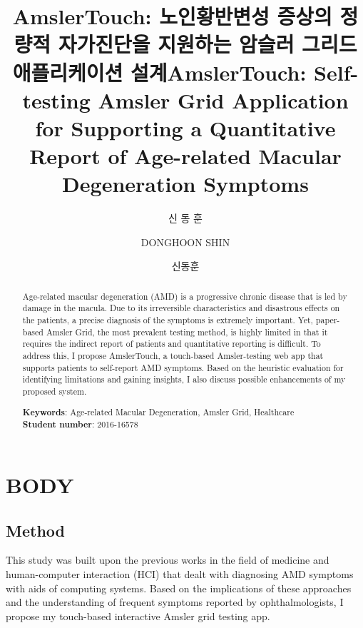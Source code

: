 \documentclass[doctor]{snuece-bs}
\title[korean]{AmslerTouch: 노인황반변성 증상의 정량적 자가진단을 지원하는 암슬러 그리드 애플리케이션 설계}
\title[english]{AmslerTouch: Self-testing Amsler Grid Application for Supporting a Quantitative Report of Age-related Macular Degeneration Symptoms}
\author[korean]{신 동 훈}
\author[english]{DONGHOON SHIN}
\author[nospace]{신동훈}
\begin{document}
\renewcommand{\baselinestretch}{1.5}

\selectfont

\begin{abstract}
	\par
	Age-related macular degeneration (AMD) is a progressive chronic disease that is led by damage in the macula. Due to its irreversible characteristics and disastrous effects on the patients, a precise diagnosis of the symptoms is extremely important. Yet, paper-based Amsler Grid, the most prevalent testing method, is highly limited in that it requires the indirect report of patients and quantitative reporting is difficult. To address this, I propose AmslerTouch, a touch-based Amsler-testing web app that supports patients to self-report AMD symptoms. Based on the heuristic evaluation for identifying limitations and gaining insights, I also discuss possible enhancements of my proposed system.
	\vfill
	\begin{minipage}[t][20mm][b]{\textwidth}
		{\bfseries Keywords}: Age-related Macular Degeneration, Amsler Grid, Healthcare\\
		{\bfseries Student number}: 2016-16578\\
	\end{minipage}
	
\end{abstract}

\changepage{5mm}{}{}{}{}{}{}{}{-5mm}

\makelists



\chapter{BODY}

\section{Method}
This study was built upon the previous works in the field of medicine and human-computer interaction (HCI) that dealt with diagnosing AMD symptoms with aids of computing systems. Based on the implications of these approaches and the understanding of frequent symptoms reported by ophthalmologists, I propose my touch-based interactive Amsler grid testing app.






%


\printbibliography[heading=bibintoc,title={References}]
\end{document}
